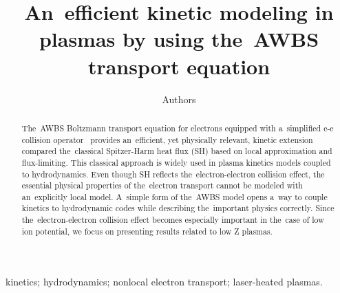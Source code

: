 \documentclass[preprint,12pt]{elsarticle}
\begin{document}
\begin{frontmatter}



\title{An~efficient kinetic modeling in plasmas by using the~AWBS transport equation}


\author[a,b]{Authors}

\address[a]{Centre Lasers Intenses et Applications, Universite de Bordeaux-CNRS-CEA, UMR 5107, F-33405 Talence, France}

\begin{abstract}
The~AWBS Boltzmann transport equation for electrons equipped with 
a~simplified e-e collision operator~\cite{AWBS_PRL1986}
provides an~efficient, yet physically 
relevant, kinetic extension compared the~classical 
Spitzer-Harm heat flux (SH)
based on local approximation and flux-limiting.
This classical approach is widely used in plasma
kinetics models coupled to hydrodynamics. 
Even though SH reflects the~electron-electron collision effect, 
the essential physical properties
of the~electron transport cannot be modeled with 
an~explicitly local model. A~simple form of the~AWBS model opens a~way 
to couple kinetics to hydrodynamic codes while describing the~important 
physics correctly. Since the~electron-electron collision effect becomes 
especially important in the~case of low ion potential, we focus on presenting 
results related to low Z plasmas.
\end{abstract}

\begin{keyword}
kinetics; hydrodynamics; nonlocal electron transport; laser-heated plasmas.

\end{keyword}

\end{frontmatter}
\end{document}

